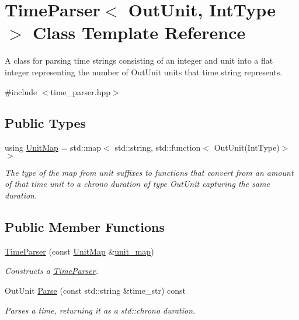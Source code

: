 \hypertarget{classTimeParser}{\section{Time\+Parser$<$ Out\+Unit, Int\+Type $>$ Class Template Reference}
\label{classTimeParser}
}


A class for parsing time strings consisting of an integer and unit into a flat integer representing the number of Out\+Unit units that time string represents.  




{\ttfamily \#include $<$time\+\_\+parser.\+hpp$>$}

\subsection*{Public Types}
\begin{DoxyCompactItemize}
\item 
\hypertarget{classTimeParser_adc32afc638ace5060a2134f8f74d3c60}{using \hyperlink{classTimeParser_adc32afc638ace5060a2134f8f74d3c60}{Unit\+Map} = std\+::map$<$ std\+::string, std\+::function$<$ Out\+Unit(Int\+Type)$>$$>$}\label{classTimeParser_adc32afc638ace5060a2134f8f74d3c60}

\begin{DoxyCompactList}\small\item\em The type of the map from unit suffixes to functions that convert from an amount of that time unit to a chrono duration of type Out\+Unit capturing the same duration. \end{DoxyCompactList}\end{DoxyCompactItemize}
\subsection*{Public Member Functions}
\begin{DoxyCompactItemize}
\item 
\hyperlink{classTimeParser_a66c6443db8e5d38b8f3d7e7a4eea783a}{Time\+Parser} (const \hyperlink{classTimeParser_adc32afc638ace5060a2134f8f74d3c60}{Unit\+Map} \&\hyperlink{classTimeParser_a98bb2b31f6ad5210139bc87ef7ad0121}{unit\+\_\+map})
\begin{DoxyCompactList}\small\item\em Constructs a \hyperlink{classTimeParser}{Time\+Parser}. \end{DoxyCompactList}\item 
Out\+Unit \hyperlink{classTimeParser_a68110dc8c7d2ad1a8f47a29646ad4d1c}{Parse} (const std\+::string \&time\+\_\+str) const 
\begin{DoxyCompactList}\small\item\em Parses a time, returning it as a std\+::chrono duration. \end{DoxyCompactList}\end{DoxyCompactItemize}
